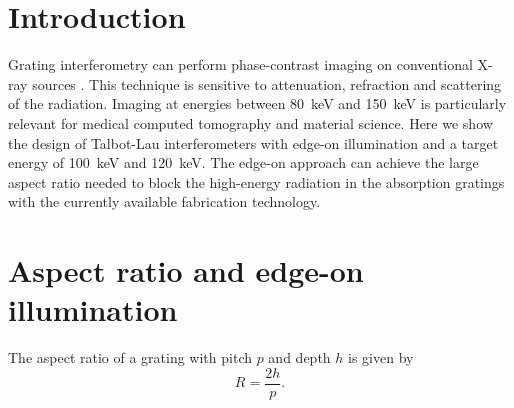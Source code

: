\documentclass[a0,portrait]{a0poster}
\begin{document}

\begin{multicols}{2} %


\color{Navy} %

\thispagestyle{empty}
\section*{Introduction}
Grating interferometry \cite{David2002} can perform phase-contrast imaging on
    conventional X-ray sources \cite{Pfeiffer2006}. This technique is sensitive to attenuation,
    refraction and scattering of the radiation.
    Imaging at energies between \SI{80}{\kilo\eV} and \SI{150}{\kilo\eV} is
    particularly relevant for medical computed tomography and material
    science.
    Here we show the design of Talbot-Lau interferometers with edge-on
    illumination and a target energy of \SI{100}{\kilo\eV} and
    \SI{120}{\kilo\eV}. The edge-on
    approach can achieve the large aspect ratio needed to block the
    high-energy radiation in the absorption gratings with the
    currently available fabrication technology.


\color{DarkSlateGray} %

\section*{Aspect ratio and edge-on illumination}
The aspect ratio of a grating with pitch $p$ and depth $h$ is given by
\vspace{.5\baselineskip}
\begin{equation*}
    R = \frac{2h}{p}.
\end{equation*}
\vspace{.5\baselineskip}


\end{multicols}
\end{document}
